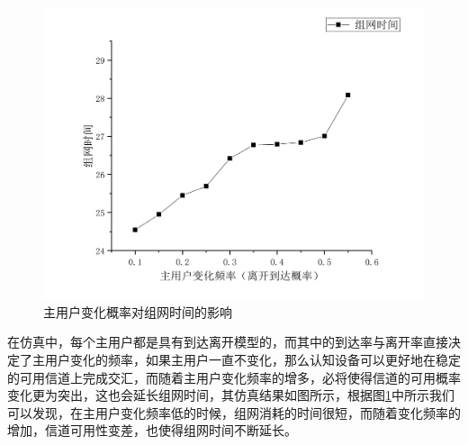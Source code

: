 \documentclass[a4paper,AutoFakeBold,oneside,12pt]{book}
\begin{document}
  \begin{figure}[htbp]
\centering %
\includegraphics[scale=0.3]{pictures/PU-time.png} 
\caption{主用户变化概率对组网时间的影响 } %
\label{PU-time}
\end{figure}
  在仿真中，每个主用户都是具有到达离开模型的，而其中的到达率与离开率直接决定了主用户变化的频率，如果主用户一直不变化，那么认知设备可以更好地在稳定的可用信道上完成交汇，而随着主用户变化频率的增多，必将使得信道的可用概率变化更为突出，这也会延长组网时间，其仿真结果如图所示，根据图\ref{PU-time}中所示我们可以发现，在主用户变化频率低的时候，组网消耗的时间很短，而随着变化频率的增加，信道可用性变差，也使得组网时间不断延长。
\end{document}
